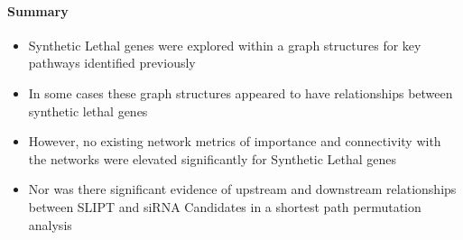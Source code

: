 \paragraph{Summary}

  \begin{itemize}
   \item Synthetic Lethal genes were explored within a graph structures for key pathways identified previously 
   
   \bigskip
   
   \item In some cases these graph structures appeared to have relationships between synthetic lethal genes  
   
   \bigskip
   
   \item However, no existing network metrics of importance and connectivity with the networks were elevated significantly for Synthetic Lethal genes
   
   \bigskip
   
   \item Nor was there significant evidence of upstream and downstream relationships between SLIPT and siRNA Candidates in a shortest path permutation analysis
  \end{itemize}
  
\clearpage